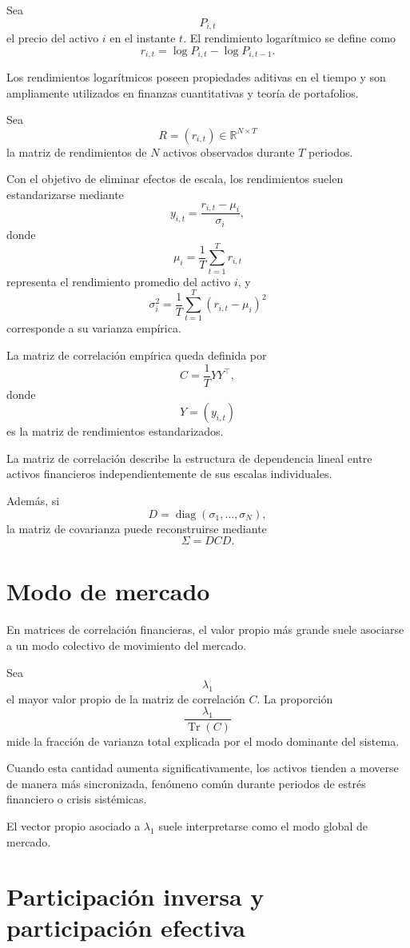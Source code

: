 \documentclass[letterpaper,12pt,oneside]{book}
\begin{document}
Sea
\[
P_{i,t}
\]
el precio del activo \(i\) en el instante \(t\). El rendimiento logarítmico se define como
\[
r_{i,t}
=
\log P_{i,t}
-
\log P_{i,t-1}.
\]

Los rendimientos logarítmicos poseen propiedades aditivas en el tiempo y son ampliamente utilizados en finanzas cuantitativas y teoría de portafolios.

Sea
\[
R=(r_{i,t})
\in
\mathbb{R}^{N\times T}
\]
la matriz de rendimientos de \(N\) activos observados durante \(T\) periodos.

Con el objetivo de eliminar efectos de escala, los rendimientos suelen estandarizarse mediante
\[
y_{i,t}
=
\frac{
r_{i,t}-\mu_i
}{
\sigma_i
},
\]
donde
\[
\mu_i
=
\frac1T
\sum_{t=1}^T r_{i,t}
\]
representa el rendimiento promedio del activo \(i\), y
\[
\sigma_i^2
=
\frac1T
\sum_{t=1}^T
(r_{i,t}-\mu_i)^2
\]
corresponde a su varianza empírica.

La matriz de correlación empírica queda definida por
\[
C
=
\frac1T
YY^\top,
\]
donde
\[
Y=(y_{i,t})
\]
es la matriz de rendimientos estandarizados.

La matriz de correlación describe la estructura de dependencia lineal entre activos financieros independientemente de sus escalas individuales.

Además, si
\[
D=
\operatorname{diag}
(\sigma_1,\dots,\sigma_N),
\]
la matriz de covarianza puede reconstruirse mediante
\[
\Sigma
=
DCD.
\]

\section{Modo de mercado}

En matrices de correlación financieras, el valor propio más grande suele asociarse a un modo colectivo de movimiento del mercado.

Sea
\[
\lambda_1
\]
el mayor valor propio de la matriz de correlación \(C\). La proporción
\[
\frac{\lambda_1}{\operatorname{Tr}(C)}
\]
mide la fracción de varianza total explicada por el modo dominante del sistema.

Cuando esta cantidad aumenta significativamente, los activos tienden a moverse de manera más sincronizada, fenómeno común durante periodos de estrés financiero o crisis sistémicas.

El vector propio asociado a \(\lambda_1\) suele interpretarse como el modo global de mercado.

\section{Participación inversa y participación efectiva}
\end{document}
